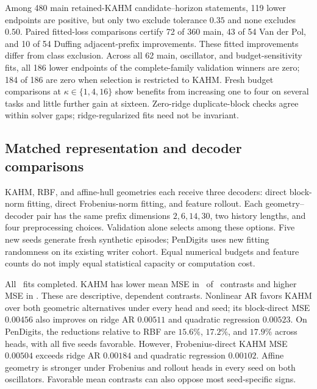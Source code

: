 Among 480 main retained-KAHM candidate--horizon statements, 119 lower
endpoints are positive, but only two exclude tolerance $0.35$ and none
excludes $0.50$. Paired fitted-loss comparisons certify 72 of 360 main,
43 of 54 Van der Pol, and 10 of 54 Duffing adjacent-prefix improvements.
These fitted improvements differ from class exclusion. Across all 62 main,
oscillator, and budget-sensitivity fits, all 186 lower endpoints of the
complete-family validation winners are zero; 184 of 186 are zero when
selection is restricted to KAHM. Fresh budget comparisons at
$\kappa\in\{1,4,16\}$ show benefits from increasing one to four on several
tasks and little further gain at sixteen. Zero-ridge duplicate-block checks
agree within solver gaps; ridge-regularized fits need not be invariant.

\subsection{Matched representation and decoder comparisons}
\label{sec:matched-geometry}


KAHM, RBF, and affine-hull geometries each receive three decoders: direct
block-norm fitting, direct Frobenius-norm fitting, and feature rollout. Each
geometry--decoder pair has the same prefix dimensions $2,6,14,30$, two
history lengths, and four preprocessing choices. Validation alone selects
among these options. Five new seeds generate fresh synthetic episodes;
PenDigits uses new fitting randomness on its existing writer cohort.
Equal numerical budgets and feature counts do not imply equal statistical
capacity or computation cost.



All \MatchedCandidates\ fits completed. KAHM has lower mean MSE in
\MatchedImproved\ of \MatchedComparisons\ contrasts and higher MSE in
\MatchedDegraded. These are descriptive, dependent contrasts. Nonlinear AR
favors KAHM over both geometric alternatives under every head and seed;
its block-direct MSE $0.00456$ also improves on ridge AR $0.00511$ and
quadratic regression $0.00523$. On PenDigits, the reductions relative to RBF
are $15.6\%$, $17.2\%$, and $17.9\%$ across heads, with all five seeds
favorable. However, Frobenius-direct KAHM MSE $0.00504$ exceeds ridge AR
$0.00184$ and quadratic regression $0.00102$. Affine geometry is stronger
under Frobenius and rollout heads in every seed on both oscillators.
Favorable mean contrasts can also oppose most seed-specific signs.

